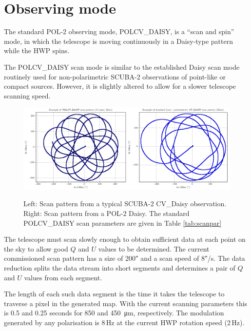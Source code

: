 \section{Observing mode}
\label{sec:mmodes}

The standard POL-2 observing mode, POLCV\_DAISY, is a “scan and spin”
mode, in which the telescope is moving continuously in a Daisy-type
pattern while the HWP spins.

The POLCV\_DAISY scan mode is similar to the established Daisy scan
mode routinely used for non-polarimetric SCUBA-2 observations of
point-like or compact sources. However, it is slightly altered to allow
for a slower telescope scanning speed.


\begin{figure}[t!]
\begin{center}
\includegraphics[width=0.9\linewidth]{scan_pattern_daisy_comparison.png}
\label{fig:scancompsrison}
\caption [Scan Pattern Comparison]{Left: Scan pattern from a typical
  SCUBA-2 CV\_Daisy observation. Right: Scan pattern from a POL-2
  Daisy. The standard POLCV\_DAISY scan parameters are given in Table
  \ref{tab:scanpar} }
\end{center}
\end{figure}


The telescope must scan slowly enough to obtain sufficient data at
each point on the sky to allow good $Q$ and $U$ values to be
determined. The current commissioned scan pattern has a size of
200\si{\arcsecond} and a scan speed of 8\si{\arcsecond}/s. The data
reduction splits the data stream into short segments and determines a
pair of $Q$ and $U$ values from each segment.

The length of each such data segment is the time it takes the
telescope to traverse a pixel in the generated map. With the current
scanning parameters this is 0.5 and 0.25 seconds for 850 and
\SI{450}{\micro\metre}, respectively. The modulation generated by any
polarisation is 8\,Hz at the current HWP rotation speed (2\,Hz).

